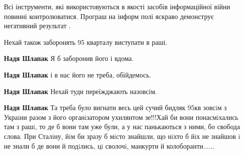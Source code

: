 \begin{itemize}
 

Всі інструменти, які використовуються в якості засобів інформаційної війни
повинні контролюватися. Програш на інформ полі яскраво демонструє негативний
результат .


 
Нехай також заборонять 95 кварталу виступати в раші.

\begin{itemize}
 
\textbf{Надя Шлапак} Я б заборонив його і вдома.

 
\textbf{Надя Шлапак} і в нас його не треба, обійдемось.

 
\textbf{Надя Шлапак} Нехай туди переїжджають назовсім.

 
\textbf{Надя Шлапак} Та треба було вигнати весь цей сучий бидляк 95кв зовсiм з
Украiни разом з його органiзатором ухилянтом зе!!!Хай би вони понасмiхались там
з рашi, то де б вони там уже були, а у нас панькаються з ними, бо свобода
слова. При Сталiну, йiм би зразу б мiсто знайшли, що нiхто б йiх не знайшов i
не знали б де вони й подiлись, цi сволочi, манкурти й колоборанти......
\end{itemize}


\end{itemize}
